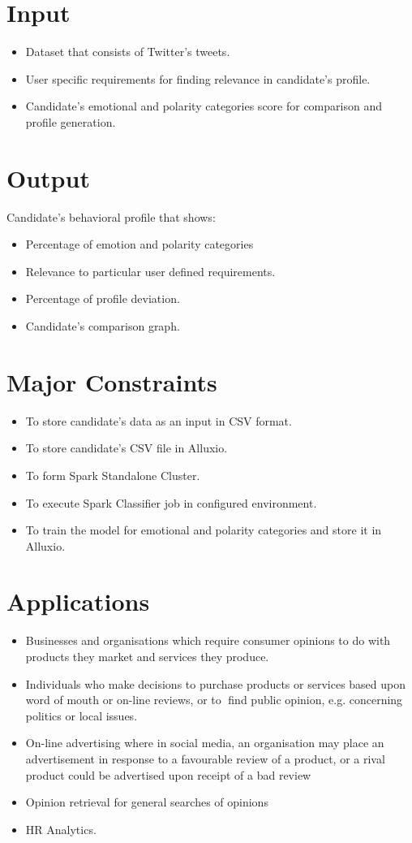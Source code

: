 \documentclass[oneside,a4paper,12pt]{pictreport}
\begin{document}
\section{Input}
\begin{itemize}
\item Dataset that consists of Twitter's tweets.
\item User specific requirements for finding relevance in candidate's profile.
\item Candidate's emotional and polarity categories score for comparison and profile generation.
\end{itemize}


\section{Output}
Candidate's behavioral profile that shows:
\begin{itemize}
\item Percentage of emotion and polarity categories
\item Relevance to particular user defined requirements.
\item Percentage of profile deviation.
\item Candidate's comparison graph.
\end{itemize}

\section{Major Constraints}

\begin{itemize}
\item To store candidate's data as an input in CSV format.
\item To store candidate's CSV file in Alluxio.
\item To form Spark Standalone Cluster. 
\item To execute Spark Classifier job in configured environment.
\item To train the model for emotional and polarity categories and store it in Alluxio.
\end{itemize}

\section{Applications}
\begin{itemize}
\item Businesses and organisations which require consumer opinions to do with products they market and services they produce.
\item Individuals who make decisions to purchase products or services based upon word of mouth or on-line reviews, or to find public opinion, e.g. concerning politics or local issues.
\item On-line advertising where in social media, an organisation may place an advertisement in response to a favourable review of a product, or a rival product could be advertised upon receipt of a bad review
\item Opinion retrieval for general searches of opinions
\item HR Analytics.
\end{itemize}
\end{document}
